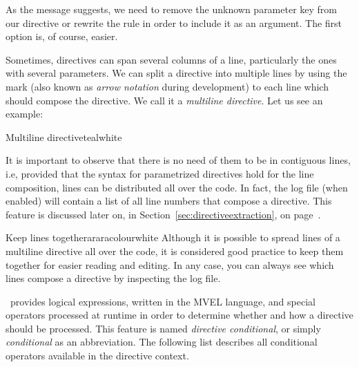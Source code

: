 As the message suggests, we need to remove the unknown parameter key from our directive or rewrite the rule in order to include it as an argument. The first option is, of course, easier.


Sometimes, directives can span several columns of a line, particularly the ones with several parameters. We can split a directive into multiple lines by using the  mark (also known as \emph{arrow notation} during development) to each line which should compose the directive. We call it a \emph{multiline directive}. Let us see an example:

\begin{codebox}{Multiline directive}{teal}{\icnote}{white}
\end{codebox}

It is important to observe that there is no need of them to be in contiguous lines, i.e, provided that the syntax for parametrized directives hold for the line composition, lines can be distributed all over the code. In fact, the log file (when enabled) will contain a list of all line numbers that compose a directive. This feature is discussed later on, in Section~\ref{sec:directiveextraction}, on page~\pageref{sec:directiveextraction}.

\begin{messagebox}{Keep lines together}{araracolour}{\icinfo}{white}
Although it is possible to spread lines of a multiline directive all over the code, it is considered good practice to keep them together for easier reading and editing. In any case, you can always see which lines compose a directive by inspecting the log file.
\end{messagebox}

\arara\ provides logical expressions, written in the \gls{MVEL} language, and special operators processed at runtime in order to determine whether and how a directive should be processed. This feature is named \emph{directive conditional}, or simply \emph{conditional} as an abbreviation. The following list describes all conditional operators available in the directive context.

